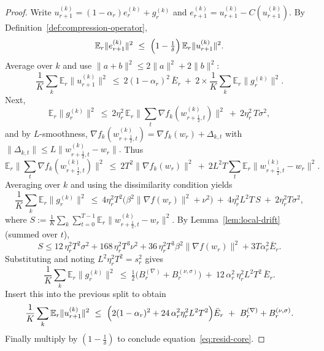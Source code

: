 \documentclass{article} %
\def\eqref#1{equation~\ref{#1}}
\newcommand{\E}{\mathbb{E}}
\begin{document}
\begin{proof}
Write $u_{r+1}^{(k)}=(1-\alpha_r)e_r^{(k)}+g_r^{(k)}$ and
$e_{r+1}^{(k)}=u_{r+1}^{(k)}-C(u_{r+1}^{(k)})$.
By Definition~\ref{def:compression-operator},
\[
\E_r\|e_{r+1}^{(k)}\|^{2}\ \le\ \Bigl(1-\tfrac1\delta\Bigr)\,\E_r\|u_{r+1}^{(k)}\|^{2}.
\]
Average over $k$ and use $\|a+b\|^{2}\le 2\|a\|^{2}+2\|b\|^{2}$:
\[
\frac1K\sum_{k}\E_r\|u_{r+1}^{(k)}\|^{2}
\ \le\ 2(1-\alpha_r)^{2}\,\bar E_r\ +\ 2\times\frac1K\sum_{k}\E_r\|g_r^{(k)}\|^{2}.
\]
Next,
\[
\E_r\|g_r^{(k)}\|^{2}
\ \le\ 2\eta_r^{2}\,\E_r\Big\|\sum_{t}\nabla f_k(w_{r+\frac12,t}^{(k)})\Big\|^{2}
\ +\ 2\eta_r^{2}\,T\sigma^{2},
\]
and by $L$-smoothness,
\(
\nabla f_k(w_{r+\frac12,t}^{(k)})=\nabla f_k(w_r)+\Delta_{k,t}
\)
with
\(
\|\Delta_{k,t}\|\le L\|w_{r+\frac12,t}^{(k)}-w_r\|.
\)
Thus
\[
\E_r\Big\|\sum_{t}\nabla f_k(w_{r+\frac12,t}^{(k)})\Big\|^{2}
\ \le\ 2T^{2}\|\nabla f_k(w_r)\|^{2}\ +\ 2L^{2}T\sum_{t}\E_r\|w_{r+\frac12,t}^{(k)}-w_r\|^{2}.
\]
Averaging over $k$ and using the dissimilarity condition yields
\[
\frac1K\sum_{k}\E_r\|g_r^{(k)}\|^{2}
\ \le\ 4\eta_r^{2}T^{2}\bigl(\beta^{2}\|\nabla f(w_r)\|^{2}+\nu^{2}\bigr)
\ +\ 4\eta_r^{2}L^{2}T\,S
\ +\ 2\eta_r^{2}T\sigma^{2},
\]
where
\(
S:=\frac1K\sum_{k}\sum_{t=0}^{T-1}\E_r\|w_{r+\frac12,t}^{(k)}-w_r\|^{2}.
\)
By Lemma~\ref{lem:local-drift} (summed over \(t\)),
\[
S \le
12\,\eta_r^{2}T^{2}\sigma^{2}
+168\,\eta_r^{2}T^{3}\nu^{2}
+36\,\eta_r^{2}T^{3}\beta^{2}\|\nabla f(w_r)\|^{2}
+3T\alpha_r^2 \bar E_r.
\]
Substituting and noting $L^{2}\eta_r^{2}T^{2}=s_r^{2}$ gives
\[
\frac1K\sum_{k}\E_r\|g_r^{(k)}\|^{2}
\ \le\ \tfrac12\bigl(B_r^{(\nabla)}+B_r^{(\nu,\sigma)}\bigr)
\ +\ 12\,\alpha_r^{2}\,\eta_r^{2}L^{2}T^{2}\,\bar E_r .
\]
Insert this into the previous split to obtain
\[
\frac1K\sum_{k}\E_r\|u_{r+1}^{(k)}\|^{2}
\ \le\ \Bigl(2(1-\alpha_r)^{2}+24\,\alpha_r^{2}\eta_r^{2}L^{2}T^{2}\Bigr)\bar E_r
\ +\ B_r^{(\nabla)}+B_r^{(\nu,\sigma)}.
\]
Finally multiply by $(1-\tfrac1\delta)$ to conclude \eqref{eq:resid-core}.
\end{proof}
\end{document}
